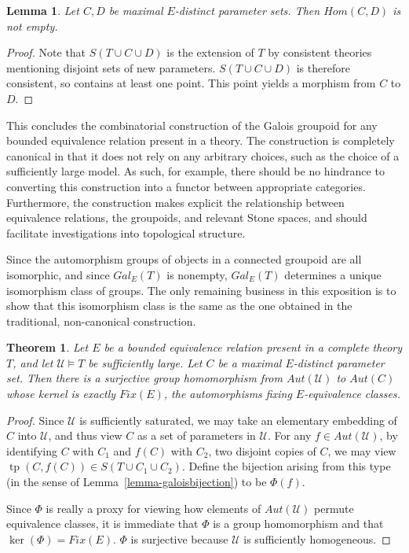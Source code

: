 \documentclass[letterpaper,twoside]{article}
\newtheorem{theorem}{Theorem}[section]
\newtheorem{lemma}{Lemma}[theorem]
\theoremstyle{definition}
\theoremstyle{remark}
\DeclareMathOperator{\tp}{tp}
\begin{document}
\begin{lemma}\label{lemma-galoisconnected}
  Let \(C,D\) be maximal \(E\)-distinct parameter sets.  Then
  \(Hom(C,D)\) is not empty.
\end{lemma}
\begin{proof}
  Note that \(S(T \cup C \cup D)\) is the extension of \(T\) by
  consistent theories mentioning disjoint sets of new parameters.
  \(S(T \cup C \cup D)\) is therefore consistent, so contains at least
  one point.  This point yields a morphism from \(C\) to \(D\).
\end{proof}

This concludes the combinatorial construction of the Galois groupoid
for any bounded equivalence relation present in a theory.  The
construction is completely canonical in that it does not rely on any
arbitrary choices, such as the choice of a sufficiently large model.
As such, for example, there should be no hindrance to converting this
construction into a functor between appropriate categories.
Furthermore, the construction makes explicit the relationship between
equivalence relations, the groupoids, and relevant Stone spaces, and
should facilitate investigations into topological structure.

Since the automorphism groups of objects in a connected groupoid are
all isomorphic, and since \(Gal_E(T)\) is nonempty, \(Gal_E(T)\)
determines a unique isomorphism class of groups.  The only remaining
business in this exposition is to show that this isomorphism class is
the same as the one obtained in the traditional, non-canonical
construction.

\begin{theorem}
  Let \(E\) be a bounded equivalence relation present in a complete
  theory \(T\), and let \(\mathcal{U} \models T\) be sufficiently
  large.  Let \(C\) be a maximal \(E\)-distinct parameter set.  Then
  there is a surjective group homomorphism from \(Aut(\mathcal{U})\)
  to \(Aut(C)\) whose kernel is exactly \(Fix(E)\), the automorphisms
  fixing \(E\)-equivalence classes.
\end{theorem}
\begin{proof}
  Since \(\mathcal{U}\) is sufficiently saturated, we may take an
  elementary embedding of \(C\) into \(\mathcal{U}\), and thus view
  \(C\) as a set of parameters in \(\mathcal{U}\).  For any \(f \in
  Aut(\mathcal{U})\), by identifying \(C\) with \(C_1\) and \(f(C)\)
  with \(C_2\), two disjoint copies of \(C\), we may view
  \(\tp(C,f(C)) \in S(T \cup C_1 \cup C_2)\).  Define the bijection
  arising from this type (in the sense of
  Lemma~\ref{lemma-galoisbijection}) to be \(\Phi(f)\).

  Since \(\Phi\) is really a proxy for viewing how elements of
  \(Aut(\mathcal{U})\) permute equivalence classes, it is immediate
  that \(\Phi\) is a group homomorphism and that \(\ker(\Phi) =
  Fix(E)\).  \(\Phi\) is surjective because \(\mathcal{U}\) is
  sufficiently homogeneous.
\end{proof}
\end{document}
